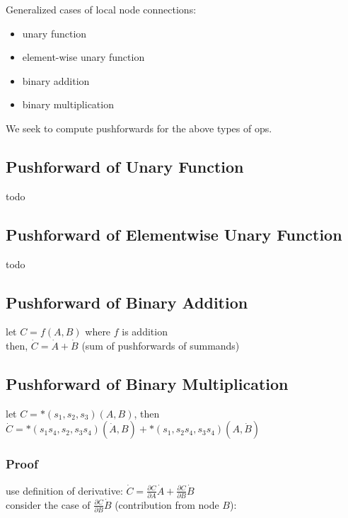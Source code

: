 \documentclass[8pt]{extarticle}
\begin{document}
\begin{multicols*}{2}
  Generalized cases of local node connections:
  \begin{itemize}
  \item unary function
  \item element-wise unary function
  \item binary addition
  \item binary multiplication
  \end{itemize}

  We seek to compute pushforwards for the above types of ops.

  \vfill\null
  \columnbreak
    
  \subsection{Pushforward of Unary Function}
  todo

  \vfill\null
  \columnbreak

  \subsection{Pushforward of Elementwise Unary Function}
  todo

  \vfill\null
  \columnbreak

  \subsection{Pushforward of Binary Addition}
  let $C=f(A,B)$ where $f$ is addition\\
  then, $\dot{C}=\dot{A} + \dot{B}$ (sum of pushforwards of summands) 

  \vfill\null
  \columnbreak

  \subsection{Pushforward of Binary Multiplication}
  let $C=*(s_1,s_2,s_3)(A,B)$, then\\
  $\dot{C} = *(s_1 s_4, s_2, s_3 s_4)(\dot{A}, B) + *(s_1, s_2 s_4, s_3 s_4)(A, \dot{B})$

  \subsubsection{Proof}
  use definition of derivative: $\dot{C} = \frac{\partial C}{\partial A} \dot{A} + \frac{\partial C}{\partial B} \dot{B}$\\
  consider the case of $\frac{\partial C}{\partial B} \dot{B}$ (contribution from node $B$):\\


\end{multicols*}
\end{document}
